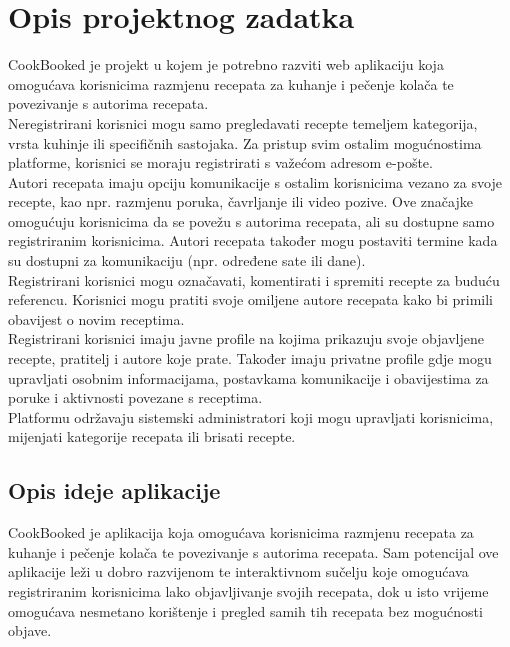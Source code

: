 \chapter{Opis projektnog zadatka}
		
		\noindent CookBooked je projekt u kojem je potrebno razviti web aplikaciju koja omogućava korisnicima razmjenu recepata za kuhanje i pečenje kolača te povezivanje s autorima recepata. \\
		
		\noindent Neregistrirani korisnici mogu samo pregledavati recepte temeljem kategorija, vrsta kuhinje ili specifičnih sastojaka. Za pristup svim ostalim mogućnostima platforme, korisnici se moraju registrirati s važećom adresom e-pošte. \\
		
		\noindent Autori recepata imaju opciju komunikacije s ostalim korisnicima vezano za svoje recepte, kao npr. razmjenu poruka, čavrljanje ili video pozive. Ove značajke omogućuju korisnicima da se povežu s autorima recepata, ali su dostupne samo registriranim korisnicima. Autori recepata također mogu postaviti termine kada su dostupni za komunikaciju (npr. određene sate ili dane). \\
		
		\noindent Registrirani korisnici mogu označavati, komentirati i spremiti recepte za buduću referencu. Korisnici mogu pratiti svoje omiljene autore recepata kako bi primili obavijest o novim receptima.\\
		
		\noindent Registrirani korisnici imaju javne profile na kojima prikazuju svoje objavljene recepte, pratitelj i autore koje prate. Također imaju privatne profile gdje mogu upravljati osobnim informacijama, postavkama komunikacije i obavijestima za poruke i aktivnosti povezane s receptima. \\
		
		\noindent Platformu održavaju sistemski administratori koji mogu upravljati korisnicima, mijenjati kategorije recepata ili brisati recepte.
		
		
		
		\section{Opis ideje aplikacije}

		\noindent CookBooked je aplikacija koja omogućava korisnicima razmjenu recepata za kuhanje i pečenje kolača te povezivanje s autorima recepata. Sam potencijal ove aplikacije leži u dobro razvijenom te interaktivnom sučelju koje omogućava registriranim korisnicima lako objavljivanje svojih recepata, dok u isto vrijeme omogućava nesmetano korištenje i pregled samih tih recepata bez mogućnosti objave.\\
		
